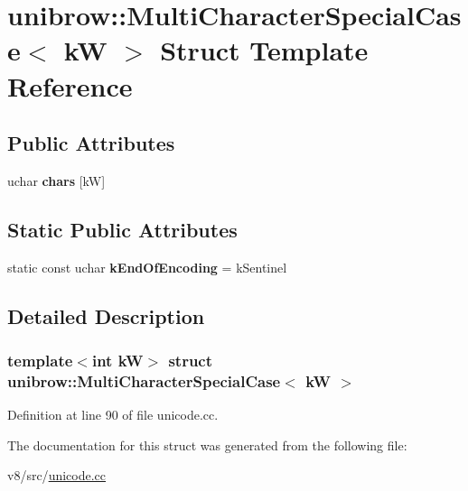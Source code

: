 \hypertarget{structunibrow_1_1MultiCharacterSpecialCase}{}\section{unibrow\+:\+:Multi\+Character\+Special\+Case$<$ kW $>$ Struct Template Reference}
\label{structunibrow_1_1MultiCharacterSpecialCase}
\subsection*{Public Attributes}
\begin{DoxyCompactItemize}
\item 
\mbox{\label{structunibrow_1_1MultiCharacterSpecialCase_aeaffec07906004ca2756c8e5bb2fe712}} 
uchar {\bfseries chars} \mbox{[}kW\mbox{]}
\end{DoxyCompactItemize}
\subsection*{Static Public Attributes}
\begin{DoxyCompactItemize}
\item 
\mbox{\label{structunibrow_1_1MultiCharacterSpecialCase_a71c9c8ec011c227da047061e12109a28}} 
static const uchar {\bfseries k\+End\+Of\+Encoding} = k\+Sentinel
\end{DoxyCompactItemize}


\subsection{Detailed Description}
\subsubsection*{template$<$int kW$>$\newline
struct unibrow\+::\+Multi\+Character\+Special\+Case$<$ k\+W $>$}



Definition at line 90 of file unicode.\+cc.



The documentation for this struct was generated from the following file\+:\begin{DoxyCompactItemize}
\item 
v8/src/\mbox{\hyperlink{unicode_8cc}{unicode.\+cc}}\end{DoxyCompactItemize}
